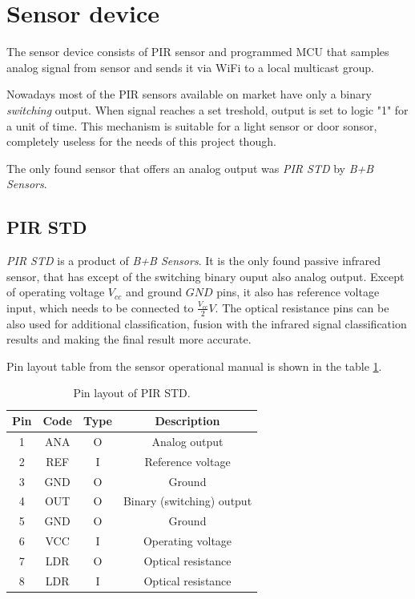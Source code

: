 \section{Sensor device}
\label{chapter:sensorHW}

The sensor device consists of PIR sensor and programmed MCU that samples analog signal from
sensor and sends it via WiFi to a local multicast group.

Nowadays most of the PIR sensors available on market have only a binary {\it switching} output.
When signal reaches a set treshold, output is set to logic "1" for a unit of time.
This mechanism is suitable for a light sensor or door sonsor, completely useless
for the needs of this project though.

The only found sensor that offers an analog output was {\it PIR STD} by {\it B+B Sensors}.

\subsection*{PIR STD}
{\it PIR STD} is a product of {\it B+B Sensors}. It is the only found passive infrared
sensor, that has except of the switching binary ouput also analog output. Except of
operating voltage $V_{cc}$ and ground $GND$ pins, it also has reference voltage input,
which needs to be connected to $\frac{V_{cc}}{2} V$. The optical resistance pins can
be also used for additional classification, fusion with the infrared signal classification
results and making the final result more accurate.

Pin layout table from the sensor operational manual is shown in the table \ref{fig:pirstdpin}.

\begin{table}[h!]
\begin{center}
\begin{tabular}{|c c | c | c |} \hline
\textbf{Pin} & \textbf{Code} & \textbf{Type} & \textbf{Description} \\ \hline
1 & ANA & O & Analog output \\ \hline
2 & REF & I & Reference voltage \\ \hline
3 & GND & O & Ground \\ \hline
4 & OUT & O & Binary (switching) output \\ \hline
5 & GND & O & Ground \\ \hline
6 & VCC & I & Operating voltage \\ \hline
7 & LDR & O & Optical resistance \\ \hline
8 & LDR & I & Optical resistance \\ \hline
\end{tabular}
\end{center}
\caption{Pin layout of PIR STD.\cite{PIROperationalManual}\label{fig:pirstdpin}}
\end{table}

